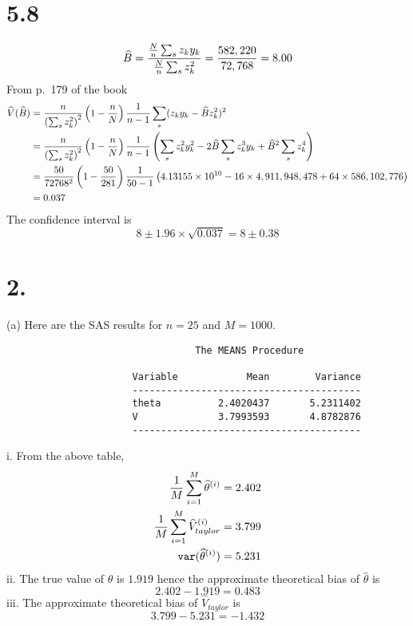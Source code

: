 \documentclass[12pt]{article}
\begin{document}

\section*{5.8}
\[
\widehat B
=
{{N\over n}\sum_sz_ky_k\over{N\over n}\sum_sz_k^2}
=
{582,220\over72,768}=8.00
\]
From p.\ 179 of the book
\begin{align*}
\widehat V(\widehat B)
&=
{n\over\left(\sum_sz_k^2\right)^2}
\left(1-{n\over N}\right){1\over n-1}
\sum_s(z_ky_k-\widehat Bz_k^2)^2\\
&=
{n\over\left(\sum_sz_k^2\right)^2}
\left(1-{n\over N}\right){1\over n-1}
\left(\sum_sz_k^2y_k^2-2\widehat B\sum_sz_k^3y_k+\widehat B^2\sum_sz_k^4\right)\\
&=
{50\over72768^2}
\left(1-{50\over281}\right){1\over50-1}
\left(4.13155\times10^{10}-16\times4,911,948,478
+64\times586,102,776\right)\\
&=0.037
\end{align*}
The confidence interval is
\[
8\pm1.96\times\sqrt{0.037}=8\pm0.38
\]


\section*{2.}
(a) Here are the SAS results for $n=25$ and $M=1000$.
\begin{verbatim}
                                 The MEANS Procedure

                      Variable            Mean        Variance
                      ----------------------------------------
                      theta          2.4020437       5.2311402
                      V              3.7993593       4.8782876
                      ----------------------------------------
\end{verbatim}
i. From the above table,
\begin{align*}
{1\over M}\sum_{i=1}^M\widehat\theta^{(i)}&=2.402\\
{1\over M}\sum_{i=1}^M\widehat V_{taylor}^{(i)}&=3.799\\
{\tt var}(\widehat\theta^{(i)})&=5.231
\end{align*}
ii. The true value of $\theta$ is $1.919$ hence
the approximate theoretical bias of $\widehat\theta$ is
\[
2.402-1.919=0.483
\]
iii. The approximate theoretical bias of $\widehat V_{taylor}$ is
\[
3.799-5.231=-1.432
\]

\end{document}
